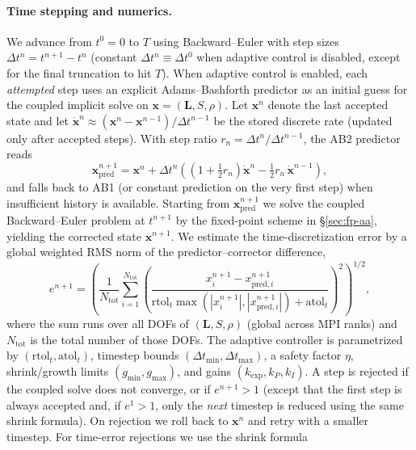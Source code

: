 \paragraph{Time stepping and numerics.}
We advance from $t^0=0$ to $T$ using Backward--Euler with step sizes $\Delta t^n=t^{n+1}-t^n$ (constant $\Delta t^n\equiv \Delta t^0$ when adaptive control is disabled, except for the final truncation to hit $T$). When adaptive control is enabled, each \emph{attempted} step uses an explicit Adams--Bashforth predictor as an initial guess for the coupled implicit solve on $\mathbf{x}=(\mathbf L,S,\rho)$. Let $\mathbf{x}^n$ denote the last accepted state and let $\dot{\mathbf x}^{n}\approx (\mathbf{x}^n-\mathbf{x}^{n-1})/\Delta t^{n-1}$ be the stored discrete rate (updated only after accepted steps). With step ratio $r_n=\Delta t^n/\Delta t^{n-1}$, the AB2 predictor reads
\begin{equation}\label{eq:ab2-predict}
\mathbf{x}_{\mathrm{pred}}^{n+1}
=\mathbf{x}^n+\Delta t^n\left(\left(1+\tfrac12 r_n\right)\dot{\mathbf x}^{n}-\tfrac12 r_n\,\dot{\mathbf x}^{n-1}\right),
\end{equation}
and falls back to AB1 (or constant prediction on the very first step) when insufficient history is available. Starting from $\mathbf{x}_{\mathrm{pred}}^{n+1}$ we solve the coupled Backward--Euler problem at $t^{n+1}$ by the fixed-point scheme in \S\ref{sec:fp-aa}, yielding the corrected state $\mathbf{x}^{n+1}$. We estimate the time-discretization error by a global weighted RMS norm of the predictor--corrector difference,
\begin{equation}\label{eq:wrms-error}
e^{n+1}
=\left(\frac{1}{N_{\mathrm{tot}}}\sum_{i=1}^{N_{\mathrm{tot}}}
\left(\frac{x_i^{n+1}-x_{\mathrm{pred},i}^{n+1}}{\mathrm{rtol}_t\max(|x_i^{n+1}|,|x_{\mathrm{pred},i}^{n+1}|)+\mathrm{atol}_t}\right)^{\!2}\right)^{\!1/2},
\end{equation}
where the sum runs over all DOFs of $(\mathbf L,S,\rho)$ (global across MPI ranks) and $N_{\mathrm{tot}}$ is the total number of those DOFs. The adaptive controller is parametrized by $(\mathrm{rtol}_t,\mathrm{atol}_t)$, timestep bounds $(\Delta t_{\min},\Delta t_{\max})$, a safety factor $\eta$, shrink/growth limits $(g_{\min},g_{\max})$, and gains $(k_{\mathrm{exp}},k_P,k_I)$. A step is rejected if the coupled solve does not converge, or if $e^{n+1}>1$ (except that the first step is always accepted and, if $e^{1}>1$, only the \emph{next} timestep is reduced using the same shrink formula). On rejection we roll back to $\mathbf{x}^n$ and retry with a smaller timestep. For time-error rejections we use the shrink formula
